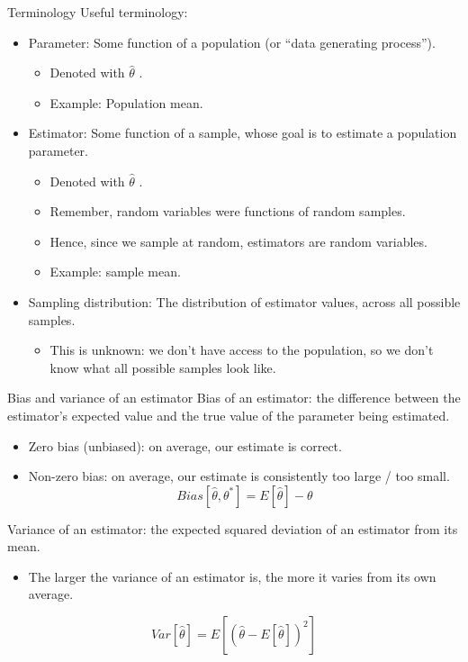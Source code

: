 \documentclass[aspectratio=169]{../latex_main/tntbeamer}  %
\begin{document}
	
	\begin{frame}{Terminology}
	    Useful terminology:
	    \begin{itemize}
	        \item Parameter: Some function of a population (or “data generating process”).
	        \begin{itemize}
	            \item Denoted with    $\hat{\theta}$    .
	            \item Example: Population mean.
	        \end{itemize}
	        \item Estimator: Some function of a sample, whose goal is to estimate a population parameter.
	        \begin{itemize}
	            \item Denoted with $\hat{\theta}$    .
                \item Remember, random variables were functions of random samples.
                \item Hence, since we sample at random, estimators are random variables.
                \item Example: sample mean.
	        \end{itemize}
	        \item Sampling distribution: The distribution of estimator values, across all possible samples.
	        \begin{itemize}
	            \item This is unknown: we don’t have access to the population, so we don’t know what all possible samples look like.
	        \end{itemize}
	    \end{itemize}
	\end{frame}
	
	
	\begin{frame}{Bias and variance of an estimator}
	    Bias of an estimator: the difference between the estimator’s expected value and the true value of the parameter being estimated.
	    \begin{itemize}
	        \item Zero bias (unbiased): on average, our estimate is correct.
	        \item  Non-zero bias: on average, our estimate is consistently too large / too small.
	        \begin{equation*}
	            Bias[\hat{\theta}, \theta^*] = E[\hat{\theta}] - \theta
	        \end{equation*}
	    \end{itemize}
	    Variance of an estimator: the expected squared deviation of an estimator from its mean.
	    \begin{itemize}
	        \item The larger the variance of an estimator is, the more it varies from its own average.
	    \end{itemize}
	    \begin{equation*}
	            Var[\hat{\theta}] = E[(\hat{\theta} - E[\hat{\theta}])^2]
	        \end{equation*}
	\end{frame}
	
\end{document}
